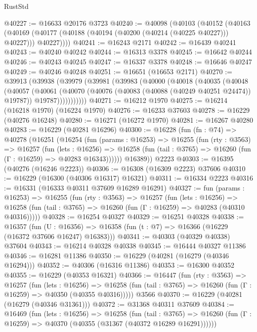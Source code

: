 \begin{lexlean}{RustStd}
\begin{coremodule}
@40227 := @16633 @20176 @3723
@40240 := @40098
    (@40103
      (@40152
        (@40163
          (@40169 (@40177 (@40188 (@40194 (@40200 (@40214 (@40225 @40227))) @40227))) @40227))))
@40241 := @16243 @2171
@40242 := @16439 @40241
@40243 := @40240 @40242
@40244 := @16313 @3378
@40245 := @16642 @40244
@40246 := @40243 @40245
@40247 := @16337 @3378
@40248 := @16646 @40247
@40249 := @40246 @40248
@40251 := @16651 (@16653 @2171)
@40270 := @39913
    (@39938
      (@39979
        (@39981
          (@39983
            (@40000
              (@40018
                (@40035
                  (@40048
                    (@40057
                      (@40061
                        (@40070
                          (@40076 (@40083 (@40088 (@40249 @40251 @24474)) @19787))
                          @19787)))))))))))
@40271 := @16212 @1970
@40275 := @16214 (@16218 @1970) (@16224 @1970)
@40276 := @16233 @37603
@40278 := @16229 (@40276 @16248)
@40280 := @16271 (@16272 @1970)
@40281 := @16267 @40280
@40283 := @16229 (@40281 @16296)
@40300 := @16228
    (fun (fn : @74) =>
    @40278
      (@16251
        (@16254
          (fun (params : @16253) =>
          @16255
            (fun (rty : @3563) =>
            @16257
              (fun (lets : @16256) =>
              @16258 (fun (tail : @3765) => @16260 (fun (Γ : @16259) => @40283 @16343))))))
        @16389))
    @2223
@40303 := @16395 (@40276 (@16246 @2223))
@40306 := @16308 (@16309 @2223) @37606
@40310 := @16229 (@16300 (@40306 @16317) @16321)
@40311 := @16334 @2223
@40316 := @16331 (@16333 @40311 @37609 @16289 @16291)
@40327 := fun (params : @16253) =>
  @16255
    (fun (rty : @3563) =>
    @16257
      (fun (lets : @16256) =>
      @16258 (fun (tail : @3765) => @16260 (fun (Γ : @16259) => @40283 (@40310 @40316)))))
@40328 := @16254 @40327
@40329 := @16251 @40328
@40338 := @16357
    (fun (U : @16356) => @16358 (fun (t : @7) => @16366 (@16229 (@16372 @37606 @16247) @16383)))
@40341 := @40303 (@40329 @40338) @37604
@40343 := @16214 @40328 @40338
@40345 := @16444 @40327 @11386
@40346 := @16281 @11386
@40350 := @16229 (@40281 (@16279 (@40346 @16294)))
@40352 := @40306 (@16316 @11386)
@40353 := @16300 @40352
@40355 := @16229 (@40353 @16321)
@40366 := @16447
    (fun (rty : @3563) =>
    @16257
      (fun (lets : @16256) =>
      @16258 (fun (tail : @3765) => @16260 (fun (Γ : @16259) => @40350 (@40355 @40316)))))
    @3566
@40370 := @16229 (@40281 (@16279 (@40346 @31361)))
@40372 := @31368 @40311 @37609
@40384 := @16469
    (fun (lets : @16256) =>
    @16258
      (fun (tail : @3765) =>
      @16260 (fun (Γ : @16259) => @40370 (@40355 (@31367 (@40372 @16289 @16291))))))

\end{coremodule}
\end{lexlean}
